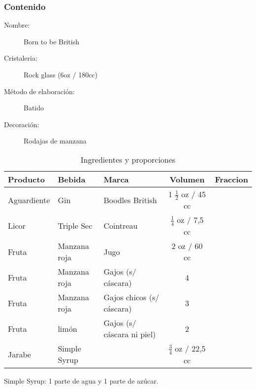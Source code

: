 \bigskip 
\bigskip 
\subsubsection{Contenido}
\bigskip 

\begin{description}
\item[Nombre:] Born to be British
\item[Cristaleria:] Rock glass (6oz / 180cc)
\item[M\'etodo de elaboraci\'on:] Batido
\item[Decoraci\'on:] Rodajas de manzana
\end{description}

\begin{table}[h]
\caption{Ingredientes y proporciones} 
\label{tab:fonts}
\begin{center}       
\begin{tabular}{|l|l|l|c|l|} %
\hline
\rule[-1ex]{0pt}{3.5ex}  \textbf{Producto} & \textbf{Bebida} & \textbf{Marca} & \textbf{Volumen} & \textbf{Fraccion}  \\
\hline
\rule[-1ex]{0pt}{3.5ex}  Aguardiente & Gin 			& Boodles British 		& 1  $\frac{1}{2}$ oz / 45 cc 	&  	\\
\hline
\rule[-1ex]{0pt}{3.5ex}  Licor 		& Triple Sec 	& Cointreau 				& $\frac{1}{4}$ oz / 7,5 cc 		&  	\\
\hline
\rule[-1ex]{0pt}{3.5ex}  Fruta 		& Manzana roja 	& Jugo	 				& 2 oz / 60 cc					& 	\\
\hline
\rule[-1ex]{0pt}{3.5ex}  Fruta 		& Manzana roja 	& Gajos (s/ c\'ascara)	& 4								& 	\\
\hline
\rule[-1ex]{0pt}{3.5ex}  Fruta 		& Manzana roja 	& Gajos chicos (s/ c\'ascara)	& 3								& 	\\
\hline
\rule[-1ex]{0pt}{3.5ex}  Fruta 		& lim\'on	 	& Gajos (s/ c\'ascara ni piel)	& 2								& 	\\
\hline
\rule[-1ex]{0pt}{3.5ex}  Jarabe		& Simple Syrup 	& 						& $\frac{3}{4}$ oz / 22,5 cc 		&  	\\
\hline
\end{tabular}
\end{center}
\end{table} 
Simple Syrup: 1 parte de agua y 1 parte de az\'ucar.
\bigskip 

